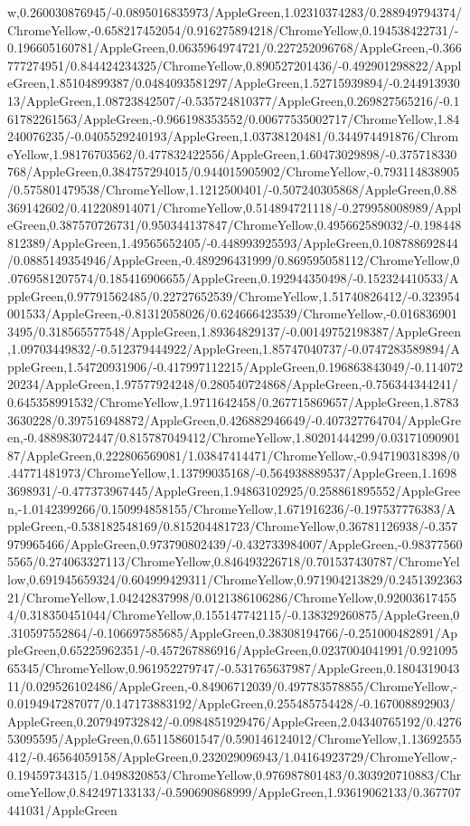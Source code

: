 {\begin{tikzternal}
w,0.260030876945/-0.0895016835973/AppleGreen,1.02310374283/0.288949794374/ChromeYellow,-0.658217452054/0.916275894218/ChromeYellow,0.194538422731/-0.196605160781/AppleGreen,0.0635964974721/0.227252096768/AppleGreen,-0.366777274951/0.844424234325/ChromeYellow,0.890527201436/-0.492901298822/AppleGreen,1.85104899387/0.0484093581297/AppleGreen,1.52715939894/-0.24491393013/AppleGreen,1.08723842507/-0.535724810377/AppleGreen,0.269827565216/-0.161782261563/AppleGreen,-0.966198353552/0.00677535002717/ChromeYellow,1.84240076235/-0.0405529240193/AppleGreen,1.03738120481/0.344974491876/ChromeYellow,1.98176703562/0.477832422556/AppleGreen,1.60473029898/-0.375718330768/AppleGreen,0.384757294015/0.944015905902/ChromeYellow,-0.793114838905/0.575801479538/ChromeYellow,1.1212500401/-0.507240305868/AppleGreen,0.88369142602/0.412208914071/ChromeYellow,0.514894721118/-0.279958008989/AppleGreen,0.387570726731/0.950344137847/ChromeYellow,0.495662589032/-0.198448812389/AppleGreen,1.49565652405/-0.448993925593/AppleGreen,0.108788692844/0.0885149354946/AppleGreen,-0.489296431999/0.869595058112/ChromeYellow,0.0769581207574/0.185416906655/AppleGreen,0.192944350498/-0.152324410533/AppleGreen,0.97791562485/0.22727652539/ChromeYellow,1.51740826412/-0.323954001533/AppleGreen,-0.81312058026/0.624666423539/ChromeYellow,-0.0168369013495/0.318565577548/AppleGreen,1.89364829137/-0.00149752198387/AppleGreen,1.09703449832/-0.512379444922/AppleGreen,1.85747040737/-0.0747283589894/AppleGreen,1.54720931906/-0.417997112215/AppleGreen,0.196863843049/-0.11407220234/AppleGreen,1.97577924248/0.280540724868/AppleGreen,-0.756344344241/0.645358991532/ChromeYellow,1.9711642458/0.267715869657/AppleGreen,1.87833630228/0.397516948872/AppleGreen,0.426882946649/-0.407327764704/AppleGreen,-0.488983072447/0.815787049412/ChromeYellow,1.80201444299/0.0317109090187/AppleGreen,0.222806569081/1.03847414471/ChromeYellow,-0.947190318398/0.44771481973/ChromeYellow,1.13799035168/-0.564938889537/AppleGreen,1.16983698931/-0.477373967445/AppleGreen,1.94863102925/0.258861895552/AppleGreen,-1.0142399266/0.150994858155/ChromeYellow,1.671916236/-0.197537776383/AppleGreen,-0.538182548169/0.815204481723/ChromeYellow,0.36781126938/-0.357979965466/AppleGreen,0.973790802439/-0.432733984007/AppleGreen,-0.983775605565/0.274063327113/ChromeYellow,0.846493226718/0.701537430787/ChromeYellow,0.691945659324/0.604999429311/ChromeYellow,0.971904213829/0.245139236321/ChromeYellow,1.04242837998/0.0121386106286/ChromeYellow,0.920036174554/0.318350451044/ChromeYellow,0.155147742115/-0.138329260875/AppleGreen,0.310597552864/-0.106697585685/AppleGreen,0.38308194766/-0.251000482891/AppleGreen,0.65225962351/-0.457267886916/AppleGreen,0.0237004041991/0.92109565345/ChromeYellow,0.961952279747/-0.531765637987/AppleGreen,0.180431904311/0.029526102486/AppleGreen,-0.84906712039/0.497783578855/ChromeYellow,-0.0194947287077/0.147173883192/AppleGreen,0.255485754428/-0.167008892903/AppleGreen,0.207949732842/-0.0984851929476/AppleGreen,2.04340765192/0.427653095595/AppleGreen,0.651158601547/0.590146124012/ChromeYellow,1.13692555412/-0.46564059158/AppleGreen,0.232029096943/1.04164923729/ChromeYellow,-0.19459734315/1.0498320853/ChromeYellow,0.976987801483/0.303920710883/ChromeYellow,0.842497133133/-0.590690868999/AppleGreen,1.93619062133/0.367707441031/AppleGreen
\end{tikzternal}}
